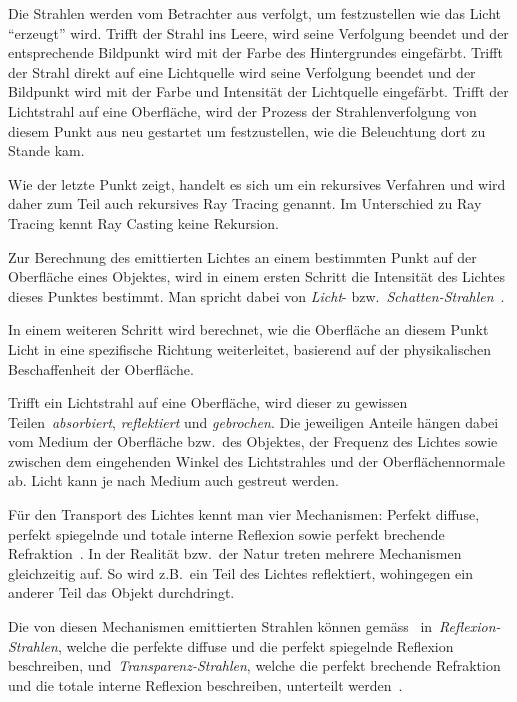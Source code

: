 Die Strahlen werden vom Betrachter aus verfolgt, um festzustellen wie
das Licht ``erzeugt'' wird. Trifft der Strahl ins Leere, wird seine
Verfolgung beendet und der entsprechende Bildpunkt wird mit der Farbe
des Hintergrundes eingefärbt. Trifft der Strahl direkt auf eine
Lichtquelle wird seine Verfolgung beendet und der Bildpunkt wird mit der
Farbe und Intensität der Lichtquelle eingefärbt. Trifft der Lichtstrahl
auf eine Oberfläche, wird der Prozess der Strahlenverfolgung von diesem
Punkt aus neu gestartet um festzustellen, wie die Beleuchtung dort zu
Stande kam.

Wie der letzte Punkt zeigt, handelt es sich um ein rekursives Verfahren
und wird daher zum Teil auch rekursives Ray Tracing genannt. Im
Unterschied zu Ray Tracing kennt Ray Casting keine Rekursion.

Zur Berechnung des emittierten Lichtes an einem bestimmten Punkt auf der
Oberfläche eines Objektes, wird in einem ersten Schritt die Intensität
des Lichtes dieses Punktes bestimmt. Man spricht dabei von
\textit{Licht}- bzw.\ \textit{Schatten-Strahlen}~\parencite[S.
10]{glassner_introduction_1989}.

In einem weiteren Schritt wird berechnet, wie die Oberfläche an
diesem Punkt Licht in eine spezifische Richtung weiterleitet, basierend
auf der physikalischen Beschaffenheit der Oberfläche.

Trifft ein Lichtstrahl auf eine Oberfläche, wird dieser zu gewissen
Teilen~\textit{absorbiert}, \textit{reflektiert} und \textit{gebrochen}.
Die jeweiligen Anteile hängen dabei vom Medium der Oberfläche bzw.~des
Objektes, der Frequenz des Lichtes sowie zwischen dem eingehenden Winkel
des Lichtstrahles und der Oberflächennormale ab.  Licht kann je nach
Medium auch gestreut werden.

Für den Transport des Lichtes kennt man vier Mechanismen: Perfekt
diffuse, perfekt spiegelnde und totale interne Reflexion sowie perfekt
brechende Refraktion~\parencite[S. 130 bis
137]{glassner_introduction_1989}. In der Realität bzw.~der Natur treten
mehrere Mechanismen gleichzeitig auf.  So wird z.B.\ ein Teil des
Lichtes reflektiert, wohingegen ein anderer Teil das Objekt durchdringt.

Die von diesen Mechanismen emittierten Strahlen können
gemäss~\citeauthor{glassner_introduction_1989}
in~\textit{Reflexion-Strahlen}, welche die perfekte diffuse und die
perfekt spiegelnde Reflexion beschreiben,
und~\textit{Transparenz-Strahlen}, welche die perfekt brechende
Refraktion und die totale interne Reflexion beschreiben, unterteilt
werden~\parencite[S.  10]{glassner_introduction_1989}.

